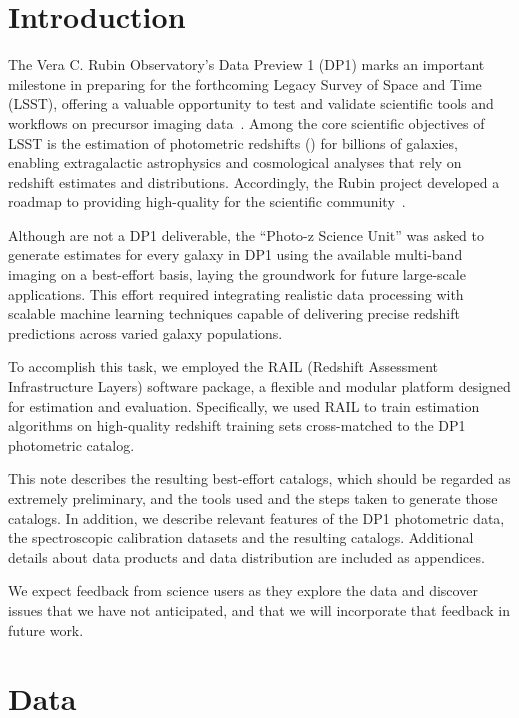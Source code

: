 \section{Introduction}
\label{sec:intro:0}

The Vera C. Rubin Observatory’s Data Preview 1 (DP1) marks an important milestone in preparing for the forthcoming Legacy Survey of Space and Time (LSST), offering a valuable opportunity to test and validate scientific tools and workflows on precursor imaging data~\citep{RTN-095}. Among the core scientific objectives of LSST is the estimation of photometric redshifts (\photozs) for billions of galaxies, enabling extragalactic astrophysics and cosmological analyses that rely on redshift estimates and distributions.  Accordingly, the Rubin project developed a roadmap to providing high-quality \photozs for the scientific community~\citep{DMTN:049}.

Although \photoz are not a DP1 deliverable, the ``Photo-z Science Unit'' was asked to generate \photoz estimates for every galaxy in DP1 using the available multi-band imaging on a best-effort basis, laying the groundwork for future large-scale applications.  This effort required integrating realistic data processing with scalable machine learning techniques capable of delivering precise redshift predictions across varied galaxy populations.

To accomplish this task, we employed the RAIL (Redshift Assessment Infrastructure Layers) software package, a flexible and modular platform designed for \photoz estimation and evaluation\citep{RAIL}.  Specifically, we used RAIL to train \photoz estimation algorithms on high-quality redshift training sets cross-matched to the DP1 photometric catalog.  

This note describes the resulting best-effort \photoz catalogs, which should be regarded as extremely preliminary, and the tools used and the steps taken to generate those catalogs.  In addition, we describe relevant features of the DP1 photometric data, the spectroscopic calibration datasets and the resulting \photoz catalogs.   Additional details about data products and data distribution are included as appendices.

We expect feedback from science users as they explore the data and discover issues that we have not anticipated, and that we will incorporate that feedback in future work.

\section{Data}
\label{sec:data:0}

